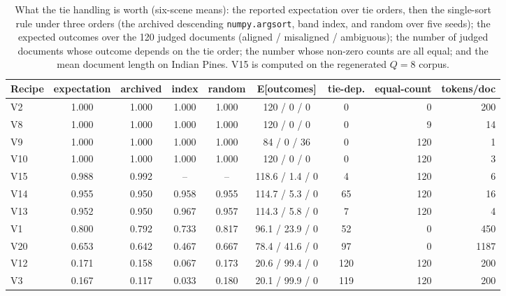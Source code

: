 \documentclass[journal,a4paper,10pt]{IEEEtran}
\begin{document}
\begin{table}[ht]
\caption{What the tie handling is worth (six-scene means): the
reported expectation over tie orders, then the single-sort rule under
three orders (the archived descending \texttt{numpy.argsort}, band
index, and random over five seeds); the expected outcomes over the 120
judged documents (aligned / misaligned / ambiguous); the number of
judged documents whose outcome depends on the tie order; the number
whose non-zero counts are all equal; and the mean document length on
Indian Pines. V15 is computed on the regenerated $Q=8$ corpus.}
\label{tab:f15ties}
\centering
\scriptsize
\setlength{\tabcolsep}{3pt}
\begin{tabular}{lccccccrr}
\toprule
Recipe & expectation & archived & index & random & E[outcomes] & tie-dep. & equal-count & tokens/doc \\
\midrule
V2  & 1.000 & 1.000 & 1.000 & 1.000 & 120 / 0 / 0        & 0   & 0   & 200 \\
V8  & 1.000 & 1.000 & 1.000 & 1.000 & 120 / 0 / 0        & 0   & 9   & 14 \\
V9  & 1.000 & 1.000 & 1.000 & 1.000 & 84 / 0 / 36        & 0   & 120 & 1 \\
V10 & 1.000 & 1.000 & 1.000 & 1.000 & 120 / 0 / 0        & 0   & 120 & 3 \\
V15 & 0.988 & 0.992 & --    & --    & 118.6 / 1.4 / 0    & 4   & 120 & 6 \\
V14 & 0.955 & 0.950 & 0.958 & 0.955 & 114.7 / 5.3 / 0    & 65  & 120 & 16 \\
V13 & 0.952 & 0.950 & 0.967 & 0.957 & 114.3 / 5.8 / 0    & 7   & 120 & 4 \\
V1  & 0.800 & 0.792 & 0.733 & 0.817 & 96.1 / 23.9 / 0    & 52  & 0   & 450 \\
V20 & 0.653 & 0.642 & 0.467 & 0.667 & 78.4 / 41.6 / 0    & 97  & 0   & 1187 \\
V12 & 0.171 & 0.158 & 0.067 & 0.173 & 20.6 / 99.4 / 0    & 120 & 120 & 200 \\
V3  & 0.167 & 0.117 & 0.033 & 0.180 & 20.1 / 99.9 / 0    & 119 & 120 & 200 \\
\bottomrule
\end{tabular}
\end{table}
\end{document}
